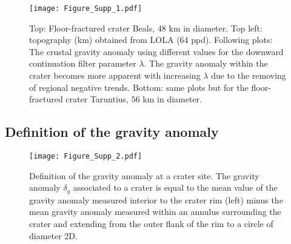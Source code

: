 \begin{figure}[h!]
  \graphicspath{ {/Users/thorey/Documents/These/Projet/FFC/Gravi_GRAIL/Article/Papier/SOUMISSION_2_EPSL/} }
  \begin{center}
    \texttt{[image: Figure\_Supp\_1.pdf]}
    \caption{Top: Floor-fractured  crater Beals, $48$ km  in diameter.
      Top  left:   topography  (km)  obtained  from   LOLA  (64  ppd).
      Following  plots: The  crustal gravity  anomaly using  different
      values for the downward continuation filter parameter $\lambda$.
      The gravity anomaly within the crater becomes more apparent with
      increasing $\lambda$  due to  the removing of  regional negative
      trends.  Bottom:  same plots but for  the floor-fractured crater
      Taruntius, $56$ km in diameter.}
    \label{Figure_Supp_1}
  \end{center}
\end{figure}

\subsection{Definition of the gravity anomaly}
\begin{figure}[h!]
  \graphicspath{ {/Users/thorey/Documents/These/Projet/FFC/Gravi_GRAIL/Article/Papier/SOUMISSION_2_EPSL/} }
  \begin{center}
    \texttt{[image: Figure\_Supp\_2.pdf]}
    \caption{Definition of the  gravity anomaly at a  crater site. The
      gravity anomaly  $\delta_g$ associated to  a crater is  equal to
      the mean value  of the gravity anomaly measured  interior to the
      crater rim (left) minus the mean gravity anomaly measured within
      an annulus surrounding  the crater and extending  from the outer
      flank of the rim to a circle of diameter 2D.}
    \label{Figure_Supp_2}
  \end{center}
\end{figure}

